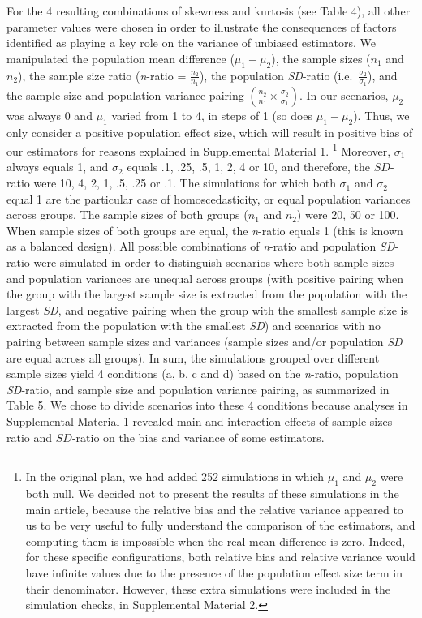 \documentclass[
  english,
  man,floatsintext]{apa6}
\begin{document}
For the 4 resulting combinations of skewness and kurtosis (see Table 4), all other parameter values were chosen in order to illustrate the consequences of factors identified as playing a key role on the variance of unbiased estimators. We manipulated the population mean difference (\(\mu_1-\mu_2\)), the sample sizes (\(n_1\) and \(n_2\)), the sample size ratio (\emph{n}-ratio = \(\frac{n_2}{n_1}\)), the population \emph{SD}-ratio (i.e.~\(\frac{\sigma_2}{\sigma_1}\)), and the sample size and population variance pairing \(\left(\frac{n_2}{n_1}\times\frac{\sigma_2}{\sigma_1} \right)\). In our scenarios, \(\mu_2\) was always 0 and \(\mu_1\) varied from 1 to 4, in steps of 1 (so does \(\mu_1-\mu_2\)). Thus, we only consider a positive population effect size, which will result in positive bias of our estimators for reasons explained in Supplemental Material 1. \footnote{In the original plan, we had added 252 simulations in which $\mu_1$ and $\mu_2$ were both null. We decided not to present the results of these simulations in the main article, because the relative bias and the relative variance appeared to us to be very useful to fully understand the comparison of the estimators, and computing them is impossible when the real mean difference is zero. Indeed, for these specific configurations, both relative bias and relative variance would have infinite values due to the presence of the population effect size term in their denominator. However, these extra simulations were included in the simulation checks, in Supplemental Material 2. } Moreover, \(\sigma_1\) always equals 1, and \(\sigma_2\) equals .1, .25, .5, 1, 2, 4 or 10, and therefore, the \(SD\)-ratio were 10, 4, 2, 1, .5, .25 or .1. The simulations for which both \(\sigma_1\) and \(\sigma_2\) equal 1 are the particular case of homoscedasticity, or equal population variances across groups. The sample sizes of both groups (\(n_1\) and \(n_2\)) were 20, 50 or 100. When sample sizes of both groups are equal, the \emph{n}-ratio equals 1 (this is known as a balanced design). All possible combinations of \emph{n}-ratio and population \emph{SD}-ratio were simulated in order to distinguish scenarios where both sample sizes and population variances are unequal across groups (with positive pairing when the group with the largest sample size is extracted from the population with the largest \emph{SD}, and negative pairing when the group with the smallest sample size is extracted from the population with the smallest \emph{SD}) and scenarios with no pairing between sample sizes and variances (sample sizes and/or population \emph{SD} are equal across all groups). In sum, the simulations grouped over different sample sizes yield 4 conditions (a, b, c and d) based on the \emph{n}-ratio, population \emph{SD}-ratio, and sample size and population variance pairing, as summarized in Table 5. We chose to divide scenarios into these 4 conditions because analyses in Supplemental Material 1 revealed main and interaction effects of sample sizes ratio and \(SD\)-ratio on the bias and variance of some estimators.
\end{document}
